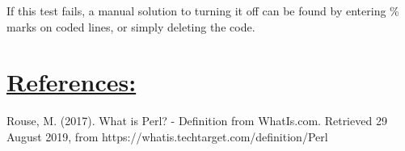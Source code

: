 \documentclass[12pt]{article}
\begin{document}
If this test fails, a manual solution to turning it off can be found by entering \% marks on coded lines, or simply deleting the code.




\vspace{3em}
\section*{\underline{\textbf{\Large References:}}}

Rouse, M. (2017). What is Perl? - Definition from WhatIs.com. Retrieved 29 August 2019, from https://whatis.techtarget.com/definition/Perl
\end{document}
